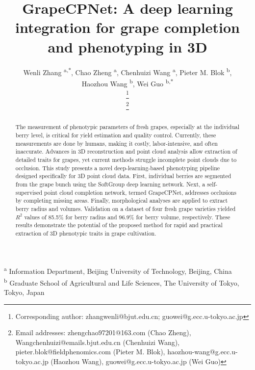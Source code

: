 \documentclass[12pt]{article}
\newcommand\blfootnote[1]{
    \begingroup
    \renewcommand\thefootnote{}\footnote{#1}
    \addtocounter{footnote}{-1}
    \endgroup
}
\begin{document}
\title{GrapeCPNet: A deep learning integration for grape completion and phenotyping in 3D}
\author{
    Wenli Zhang \textsuperscript{a,*},
    Chao Zheng \textsuperscript{a},
    Chenhuizi Wang \textsuperscript{a},
    Pieter M. Blok \textsuperscript{b}, \\
    Haozhou Wang \textsuperscript{b},
    Wei Guo \textsuperscript{b,*}
    \blfootnote{Corresponding author: zhangwenli@bjut.edu.cn; guowei@g.ecc.u-tokyo.ac.jp }
    \blfootnote{Email addresses: zhengchao97201@163.com (Chao Zheng), Wangchenhuizi@emails.bjut.edu.cn (Chenhuizi Wang), pieter.blok@fieldphenomics.com (Pieter M. Blok), haozhou-wang@g.ecc.u-tokyo.ac.jp (Haozhou Wang), guowei@g.ecc.u-tokyo.ac.jp (Wei Guo)}
}
\date{}

\maketitle

\noindent\textsuperscript{a} Information Department, Beijing University of Technology, Beijing, China \\
\textsuperscript{b} Graduate School of Agricultural and Life Sciences, The University of Tokyo, Tokyo, Japan\\

\begin{abstract}
The measurement of phenotypic parameters of fresh grapes, especially at the individual berry level, is critical for yield estimation and quality control. 
Currently, these measurements are done by humans, making it costly, labor-intensive, and often inaccurate. 
Advances in 3D reconstruction and point cloud analysis allow extraction of detailed traits for grapes, yet current methods struggle incomplete point clouds due to occlusion. 
This study presents a novel deep-learning-based phenotyping pipeline designed specifically for 3D point cloud data.                                                         
First, individual berries are segmented from the grape bunch using the SoftGroup deep learning network. 
Next, a self-supervised point cloud completion network, termed GrapeCPNet, addresses occlusions by completing missing areas.  
Finally, morphological analyses are applied to extract berry radius and volumes. 
Validation on a dataset of four fresh grape varieties yielded  $R^2$ values of 85.5\% for berry radius and 96.9\% for berry volume, respectively. 
These results demonstrate the potential of the proposed method for rapid and practical extraction of 3D phenotypic traits in grape cultivation.
\end{abstract}
\end{document}
